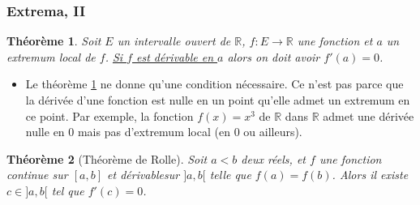 \documentclass[10pt,notheorems]{beamer}
\theoremstyle{plain}
\newtheorem{theorem}{Théorème}
\theoremstyle{definition} %
\begin{document}
\begin{frame}
  \frametitle{Extrema, II}
  \hypertarget{slide_extrema_2}{}

  \begin{theorem}\label{thm:local_extrema}
    Soit $E$  un intervalle ouvert de $\mathbb R$, $f: E\rightarrow \mathbb R$ une fonction et $a$ un extremum local de $f$. \underline{Si $f$ est dérivable en $a$} alors on doit avoir $f'(a)=0$.
  \end{theorem}

  \bigskip

  \begin{itemize}
  \item[\dbend] Le théorème \hyperlink{slide_extrema_2}{\ref{thm:local_extrema}} ne donne qu'une condition nécessaire. Ce n'est pas parce que la dérivée d'une fonction est nulle en un point qu'elle admet un extremum en ce point. Par exemple, la fonction $f(x)=x^3$ de $\mathbb R$ dans $\mathbb R$ admet une dérivée nulle en 0 mais pas d'extremum local (en 0 ou ailleurs).\newline
  \end{itemize}

  \begin{theorem}[Théorème de Rolle]\label{thm:rolle}
    Soit $a < b$ deux réels, et $f$  une fonction continue sur $[a, b]$ et dérivablesur $]a, b[$ telle que $f(a) = f(b)$. Alors il existe $c\in]a, b[$ tel que $f'(c) = 0$.
  \end{theorem}

\end{frame}
\end{document}
